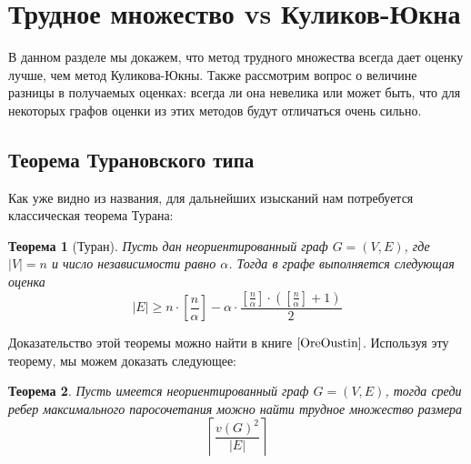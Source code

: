 \documentclass[a4paper]{article}
\newtheorem*{mtheorem}{Теорема}
\begin{document}
\addtocounter{section}{1}
\section*{Трудное множество vs Куликов-Юкна}
В данном разделе мы докажем, что метод трудного множества всегда дает оценку лучше, чем метод Куликова-Юкны.
Также рассмотрим вопрос о величине разницы в получаемых оценках: всегда ли она невелика или может быть, 
что для некоторых графов оценки из этих методов будут отличаться очень сильно. 

\setcounter{subsection}{0}
\subsection{Теорема Турановского типа}
Как уже видно из названия, для дальнейших изысканий нам потребуется классическая теорема Турана:
\begin{mtheorem}[Туран]
    Пусть дан неориентированный граф $G = (V, E)$, где $|V| = n$ и число независимости равно $\alpha$. 
    Тогда в графе выполняется следующая оценка $$|E| \geq n\cdot\left[\frac{n}{\alpha}\right] - 
    \alpha\cdot\frac{\left[\frac{n}{\alpha}\right]\cdot\left(\left[\frac{n}{\alpha}\right] + 1\right)}{2}$$
\end{mtheorem}

Доказательство этой теоремы можно найти в книге $\cite{OreOustin}$. Используя эту теорему, мы можем доказать следующее:
\begin{mtheorem}
    Пусть имеется неориентированный граф $G = (V, E)$, тогда среди ребер максимального паросочетания можно 
    найти трудное множество размера $$\left\lceil\frac{v(G)^2}{|E|}\right\rceil$$
\end{mtheorem}
\end{document}
